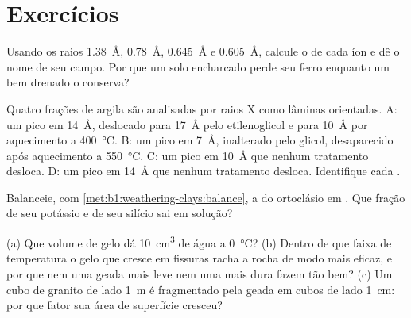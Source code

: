 \section{Exercícios}

\begin{exercise}[$\star$]\label{exo:b1:weathering-clays:1}
Usando os raios  \qty{1.38}{\angstrom},  \qty{0.78}{\angstrom},
 \qty{0.645}{\angstrom} e  \qty{0.605}{\angstrom}, calcule o  de cada íon e dê o nome de seu campo. Por que um solo encharcado perde seu ferro enquanto um bem drenado o conserva?
\end{exercise}

\begin{exercise}[$\star$]\label{exo:b1:weathering-clays:2}
Quatro frações de argila são analisadas por raios X como lâminas orientadas. A: um pico em
\SI{14}{\angstrom}, deslocado para \SI{17}{\angstrom} pelo etilenoglicol e para \SI{10}{\angstrom} por aquecimento a \SI{400}{\celsius}. B: um pico em \SI{7}{\angstrom}, inalterado pelo glicol, desaparecido após aquecimento a
\SI{550}{\celsius}. C: um pico em \SI{10}{\angstrom} que nenhum tratamento desloca. D: um pico em \SI{14}{\angstrom} que nenhum tratamento desloca. Identifique cada .
\end{exercise}

\begin{exercise}[$\star$]\label{exo:b1:weathering-clays:3}
Balanceie, com \cref{met:b1:weathering-clays:balance}, a  do ortoclásio
 em . Que fração de seu potássio e de seu silício sai em solução?
\end{exercise}

\begin{exercise}[$\star$]\label{exo:b1:weathering-clays:4}
(a) Que volume de gelo dá \qty{10}{cm^3} de água a \qty{0}{\celsius}? (b) Dentro de que faixa de temperatura o gelo que cresce em fissuras racha a rocha de modo mais eficaz, e por que nem uma geada mais leve nem uma mais dura fazem tão bem? (c) Um cubo de granito de lado \qty{1}{m} é fragmentado pela geada em cubos de lado \qty{1}{cm}: por que fator sua área de superfície cresceu?
\end{exercise}

